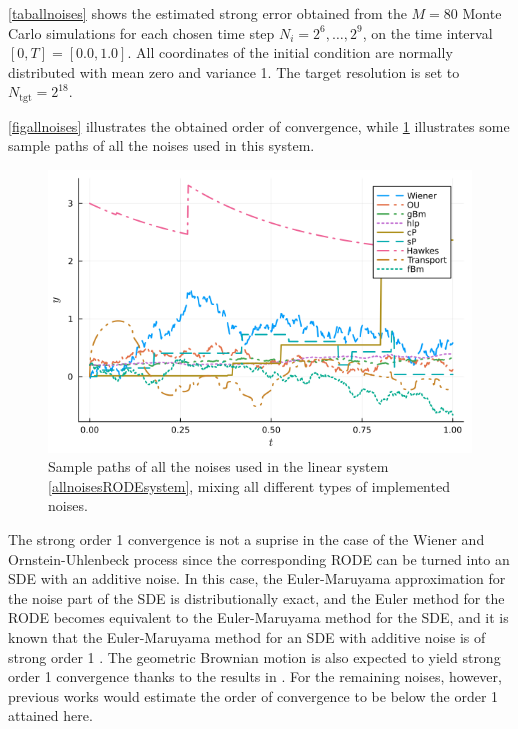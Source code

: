 \documentclass[reqno,12pt]{amsart}
\theoremstyle{plain} %
\theoremstyle{definition} %
\begin{document}
\cref{taballnoises} shows the estimated strong error obtained from the $M = 80$ Monte Carlo simulations for each chosen time step $N_i = 2^6, \ldots, 2^9$,  on the time interval $[0, T] = [0.0, 1.0]$. All coordinates of the initial condition are normally distributed with mean zero and variance 1. The target resolution is set to $N_{\textrm{tgt}} = 2^{18}$.

\cref{figallnoises} illustrates the obtained order of convergence, while \cref{figsamplepathsallnoises} illustrates some sample paths of all the noises used in this system.

\begin{figure}[htb]
    \includegraphics[scale=0.6]{img/noisepath_allnoises.png}
    \caption{Sample paths of all the noises used in the linear system \eqref{allnoisesRODEsystem}, mixing all different types of implemented noises.}
    \label{figsamplepathsallnoises}
\end{figure}

The strong order 1 convergence is not a suprise in the case of the Wiener and Ornstein-Uhlenbeck process since the corresponding RODE can be turned into an SDE with an additive noise. In this case, the Euler-Maruyama approximation for the noise part of the SDE is distributionally exact, and the Euler method for the RODE becomes equivalent to the Euler-Maruyama method for the SDE, and it is known that the Euler-Maruyama method for an SDE with additive noise is of strong order 1 \cite{HighamKloeden2021}. The geometric Brownian motion is also expected to yield strong order 1 convergence thanks to the results in \cite{WangCaoHanKloeden2021}. For the remaining noises, however, previous works would estimate the order of convergence to be below the order 1 attained here.
\end{document}
